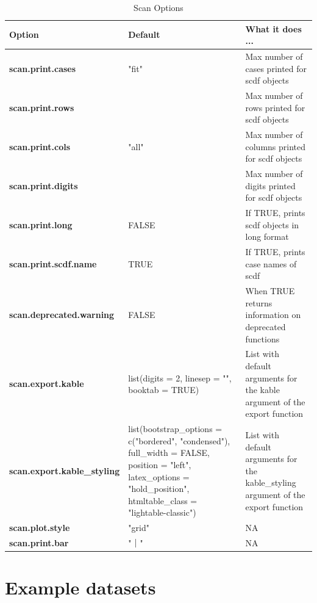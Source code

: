 \documentclass[
]{book}
\begin{document}
\begin{table}

\caption{\label{tab:table-options}Scan Options}
\begin{tabular}[t]{>{\raggedright\arraybackslash}p{15em}>{\raggedright\arraybackslash}p{15em}l}
\toprule
Option & Default & What it does ...\\
\midrule
\textbf{scan.print.cases} & "fit" & Max number of cases printed for scdf objects\\
\textbf{scan.print.rows} & 15 & Max number of rows printed for scdf objects\\
\textbf{scan.print.cols} & "all" & Max number of columns printed for scdf objects\\
\textbf{scan.print.digits} & 2 & Max number of digits printed for scdf objects\\
\textbf{scan.print.long} & FALSE & If TRUE, prints scdf objects in long format\\
\textbf{scan.print.scdf.name} & TRUE & If TRUE, prints case names of scdf\\
\textbf{scan.deprecated.warning} & FALSE & When TRUE returns information on deprecated functions\\
\textbf{scan.export.kable} & list(digits = 2, linesep = "", booktab = TRUE) & List with default arguments for the kable argument of the export function\\
\textbf{scan.export.kable\_styling} & list(bootstrap\_options = c("bordered", "condensed"), full\_width = FALSE, position = "left", latex\_options = "hold\_position", htmltable\_class = "lightable-classic") & List with default arguments for the kable\_styling argument of the export function\\
\textbf{scan.plot.style} & "grid" & NA\\
\textbf{scan.print.bar} & "｜" & NA\\
\bottomrule
\end{tabular}
\end{table}

\hypertarget{example-datasets}{%
\chapter{Example datasets}\label{example-datasets}}
\end{document}
